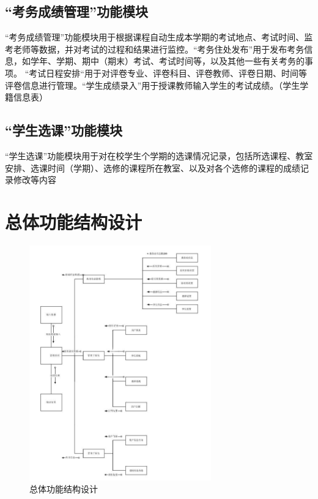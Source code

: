 \subsection{“考务成绩管理”功能模块}
“考务成绩管理”功能模块用于根据课程自动生成本学期的考试地点、考试时间、监考老师等数据，并对考试的过程和结果进行监控。“考务住处发布”用于发布考务信息，如学年、学期、期中（期末）考试、考试时间等，以及其他一些有关考务的事项。 “考试日程安排“用于对评卷专业、评卷科目、评卷教师、评卷日期、时间等评卷信息进行管理。“学生成绩录入”用于授课教师输入学生的考试成绩。（学生学籍信息表）

\subsection{“学生选课”功能模块}
“学生选课”功能模块用于对在校学生个学期的选课情况记录，包括所选课程、教室 安排、选课时间（学期）、选修的课程所在教室、以及对各个选修的课程的成绩记录修改等内容

\section{总体功能结构设计}
\begin{figure}[H] %
    \centering %
    \includegraphics[width=0.7\textwidth]{选区_005} %
    \caption{总体功能结构设计} %
    \label{Fig.main2} %
\end{figure}

